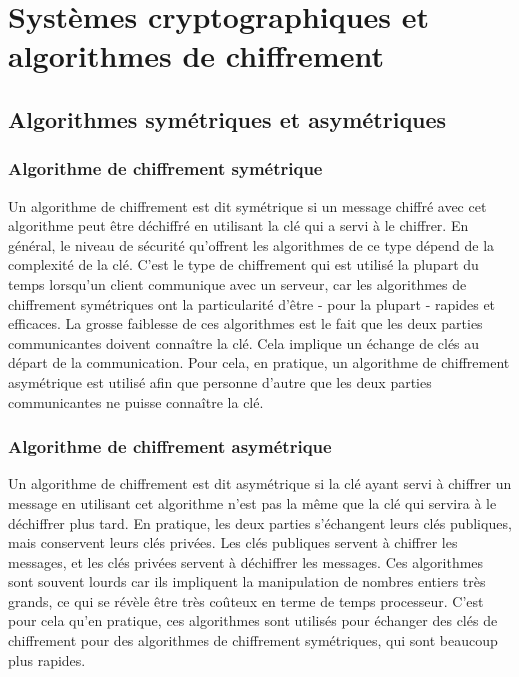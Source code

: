\chapter{Systèmes cryptographiques et algorithmes de chiffrement}
	\section{Algorithmes symétriques et asymétriques}
		\subsection{Algorithme de chiffrement symétrique}
			Un algorithme de chiffrement est dit symétrique si un message chiffré avec cet algorithme peut être déchiffré en utilisant la clé qui a servi à le chiffrer. En général, le niveau de sécurité qu'offrent les algorithmes de ce type dépend de la complexité de la clé. C'est le type de chiffrement qui est utilisé la plupart du temps lorsqu'un client communique avec un serveur, car les algorithmes de chiffrement symétriques ont la particularité d'être - pour la plupart - rapides et efficaces. La grosse faiblesse de ces algorithmes est le fait que les deux parties communicantes doivent connaître la clé. Cela implique un échange de clés au départ de la communication. Pour cela, en pratique, un algorithme de chiffrement asymétrique est utilisé afin que personne d'autre que les deux parties communicantes ne puisse connaître la clé.
		\subsection{Algorithme de chiffrement asymétrique}
			Un algorithme de chiffrement est dit asymétrique si la clé ayant servi à chiffrer un message en utilisant cet algorithme n'est pas la même que la clé qui servira à le déchiffrer plus tard. En pratique, les deux parties s'échangent leurs clés publiques, mais conservent leurs clés privées. Les clés publiques servent à chiffrer les messages, et les clés privées servent à déchiffrer les messages. Ces algorithmes sont souvent lourds car ils impliquent la manipulation de nombres entiers très grands, ce qui se révèle être très coûteux en terme de temps processeur. C'est pour cela qu'en pratique, ces algorithmes sont utilisés pour échanger des clés de chiffrement pour des algorithmes de chiffrement symétriques, qui sont beaucoup plus rapides.
